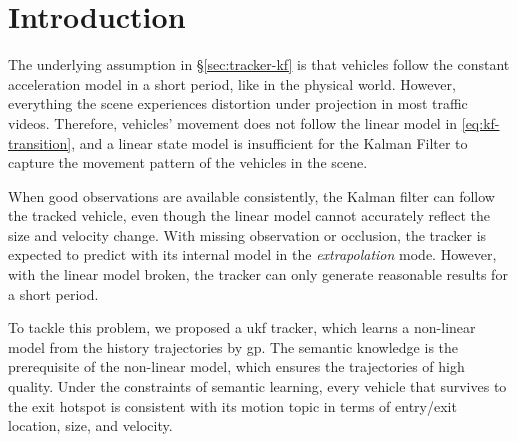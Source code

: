\section{Introduction}
\label{sec:gp-ukf-intro}

The underlying assumption in \S\ref{sec:tracker-kf} is that vehicles follow the constant acceleration model in a short period, like in the physical world.
However, everything the scene experiences distortion under projection in most traffic videos. Therefore, vehicles' movement does not follow the linear model in \ref{eq:kf-transition}, and a linear state model is insufficient for the Kalman Filter to capture the movement pattern of the vehicles in the scene.

When good observations are available consistently, the Kalman filter can follow the tracked vehicle, even though the linear model cannot accurately reflect the size and velocity change. 
With missing observation or occlusion, the tracker is expected to predict with its internal model in the \emph{extrapolation} mode. 
However, with the linear model broken, the tracker can only generate reasonable results for a short period.

To tackle this problem, we proposed a \gls{ukf} tracker, which learns a non-linear model from the history trajectories by \gls{gp}. 
The semantic knowledge is the prerequisite of the non-linear model, which ensures the trajectories of high quality.
Under the constraints of semantic learning, every vehicle that survives to the exit hotspot is consistent with its motion topic in terms of entry/exit location, size, and velocity.

